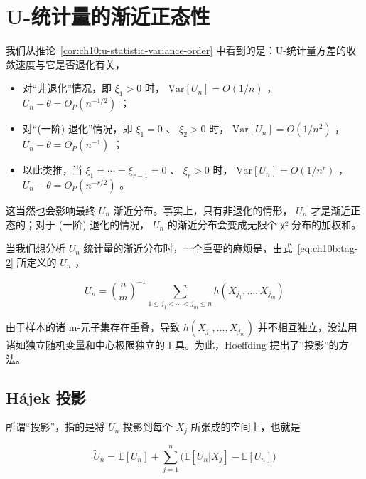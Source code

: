 
\section{U-统计量的渐近正态性}

我们从推论~\ref{cor:ch10:u-statistic-variance-order} 中看到的是：U-统计量方差的收敛速度与它是否退化有关，

\begin{itemize}
\tightlist
\item
  对``非退化''情况，即 $\xi_1>0$ 时， $\mathrm{Var}[U_n]=O(1/n)$ ， $U_n-\theta=O_P(n^{-1/2})$ ；
\item
  对``(一阶) 退化''情况，即 $\xi_1=0$ 、 $\xi_2>0$ 时， $\mathrm{Var}[U_n]=O(1/n^2)$ ， $U_n-\theta=O_P(n^{-1})$ ；
\item
  以此类推，当 $\xi_1=\cdots=\xi_{r-1}=0$ 、 $\xi_r>0$ 时， $\mathrm{Var}[U_n]=O(1/n^r)$ ， $U_n-\theta=O_P(n^{-r/2})$ 。
\end{itemize}

这当然也会影响最终 $U_n$ 渐近分布。事实上，只有非退化的情形， $U_n$ 才是渐近正态的；对于 (一阶) 退化的情况， $U_n$ 的渐近分布会变成无限个 χ² 分布的加权和。

当我们想分析 $U_n$ 统计量的渐近分布时，一个重要的麻烦是，由式~\eqref{eq:ch10b:tag-2} 所定义的 $U_n$ ，

\begin{equation}
\label{eq:ch10b:tag-2}
U_n=\binom nm^{-1}\sum_{1\le j_1<\cdots<j_m\le n}h(X_{j_1},\dots,X_{j_m})
\end{equation}

由于样本的诸 m-元子集存在重叠，导致 $h(X_{j_1},\dots,X_{j_m})$ 并不相互独立，没法用诸如独立随机变量和中心极限独立的工具。为此，Hoeffding 提出了``投影''的方法。

\subsection{Hájek 投影}

所谓``投影''，指的是将 $U_n$ 投影到每个 $X_j$ 所张成的空间上，也就是

\begin{equation}
\label{eq:ch10b:tag-3}
\widetilde{U}_n = \mathbb{E}[U_n] + \sum_{j=1}^n \bigl( \mathbb{E}[U_n| X_j] - \mathbb{E}[U_n] \bigr)
\end{equation}

